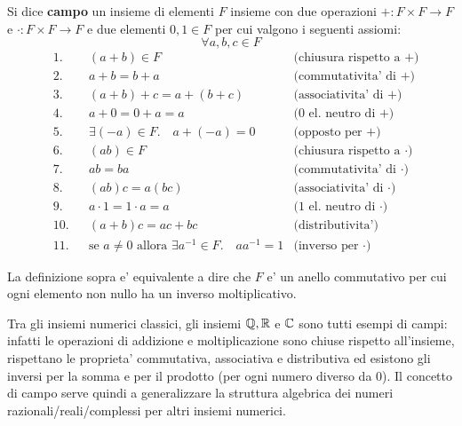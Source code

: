 \begin{definition}
    Si dice \textbf{campo} un insieme di elementi $F$ insieme con due operazioni $+ : F \times F \to F$ e $\cdot : F \times F \to F$ e due elementi $0, 1 \in F$ per cui valgono i seguenti assiomi: \[
        \forall a, b, c \in F    
    \]
    \begin{align}
        &\text{1.}      &&(a+b) \in F           &\text{(chiusura rispetto a $+$)}\\
        &\text{2.}      &&a+b = b+a             &\text{(commutativita' di $+$)}\\
        &\text{3.}      &&(a+b)+c = a+(b+c)     &\text{(associativita' di $+$)}\\
        &\text{4.}      &&a+0=0+a=a             &\text{(0 el. neutro di $+$)}\\
        &\text{5.}      &&\exists (-a) \in F. \quad a+(-a) = 0 &\text{(opposto per $+$)}\\
        &\text{6.}      &&(ab) \in F            &\text{(chiusura rispetto a $\cdot$)}\\        
        &\text{7.}      &&ab = ba               &\text{(commutativita' di $\cdot$)}\\
        &\text{8.}      &&(ab)c = a(bc)         &\text{(associativita' di $\cdot$)}\\
        &\text{9.}      &&a \cdot 1=1 \cdot a=a &\text{(1 el. neutro di $\cdot$)}\\
        &\text{10.}     &&(a+b)c = ac + bc      &\text{(distributivita')} \\
        &\text{11.}     &&\text{se } a \neq 0 \text{ allora } \exists a^{-1} \in F. \quad aa^{-1} = 1 &\text{(inverso per $\cdot$)}
    \end{align}

    La definizione sopra e' equivalente a dire che $F$ e' un anello commutativo per cui ogni elemento non nullo ha un inverso moltiplicativo.
\end{definition}

Tra gli insiemi numerici classici, gli insiemi $\mathbb{Q}, \mathbb{R}$ e $\mathbb{C}$ sono tutti esempi di campi: infatti le operazioni di addizione e moltiplicazione sono chiuse rispetto all'insieme, rispettano le proprieta' commutativa, associativa e distributiva ed esistono gli inversi per la somma e per il prodotto (per ogni numero diverso da $0$). Il concetto di campo serve quindi a generalizzare la struttura algebrica dei numeri razionali/reali/complessi per altri insiemi numerici.
